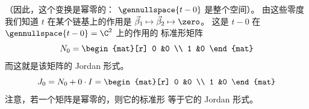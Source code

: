 \begin{exercises}
\begin{answer}
\begin{exparts}
           （因此，这个变换是幂零的：
           $\gennullspace{t-0}$ 是整个空间）。
           由这些零度我们知道 $t$ 在某个链基上的作用是
           $\vec{\beta}_1\mapsto\vec{\beta}_2\mapsto\zero$。
           这是 $t-0$ 在 $\gennullspace{t-0}=\C^2$ 上的作用的
           标准形矩阵
           \begin{equation*}
             N_0=
             \begin{mat}[r]
               0  &0  \\
               1  &0
            \end{mat}
           \end{equation*}
           而这就是该矩阵的 Jordan 形式。
           \begin{equation*}
             J_0=N_0+0\cdot I=
             \begin{mat}[r]
               0  &0  \\
               1  &0
            \end{mat}
           \end{equation*}
           注意，若一个矩阵是幂零的，则它的标准形
           等于它的 Jordan 形式。


\end{exparts}
\end{answer}
\end{exercises}
